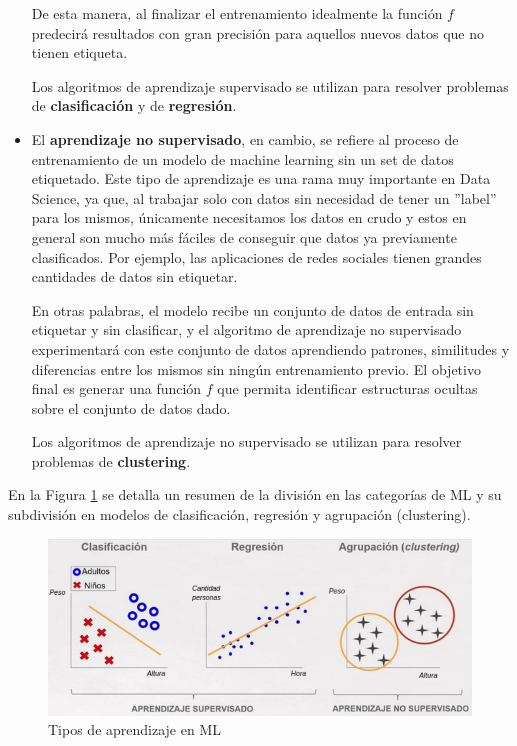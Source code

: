 \documentclass[12pt,a4paper]{article}
\begin{document}
\begin{sloppypar}
\begin{itemize}
De esta manera, al finalizar el entrenamiento idealmente la función $f$ predecirá resultados con gran precisión para aquellos nuevos datos que no tienen etiqueta. 

Los algoritmos de aprendizaje supervisado se utilizan para resolver problemas de \textbf{clasificación} y de \textbf{regresión}.

\item El \textbf{aprendizaje no supervisado}\cite{intro_clasificacion_ML}, en cambio, se refiere al proceso de entrenamiento de un modelo de machine learning sin un set de datos etiquetado. Este tipo de aprendizaje es una rama muy importante en Data Science, ya que, al trabajar solo con datos sin necesidad de tener un ”label” para los mismos, únicamente necesitamos los datos en crudo y estos en general son mucho más fáciles de conseguir que datos ya previamente clasificados. Por ejemplo, las aplicaciones de redes sociales tienen grandes cantidades de datos sin etiquetar.  

En otras palabras, el modelo recibe un conjunto de datos de entrada sin etiquetar y sin clasificar, y el algoritmo de aprendizaje no supervisado experimentará con este conjunto de datos aprendiendo patrones, similitudes y diferencias entre los mismos sin ningún entrenamiento previo. El objetivo final es generar una función $f$ que permita identificar estructuras ocultas sobre el conjunto de datos dado.

Los algoritmos de aprendizaje no supervisado se utilizan para resolver problemas de \textbf{clustering}.
\end{itemize}

\cleardoublepage
En la Figura \ref{fig:Clasif_algoritmos} se detalla un resumen de la división en las categorías de ML y su subdivisión en modelos de clasificación, regresión y agrupación (clustering). 

\begin{figure}[H]    %
  \centering
  \includegraphics[width=1\textwidth]{images/Clasificacion_algoritmos.png}
  \caption[Tipos de aprendizaje en ML]{Tipos de aprendizaje en ML\protect\footnotemark}  
  \label{fig:Clasif_algoritmos}
\end{figure}


\end{sloppypar}
\end{document}
